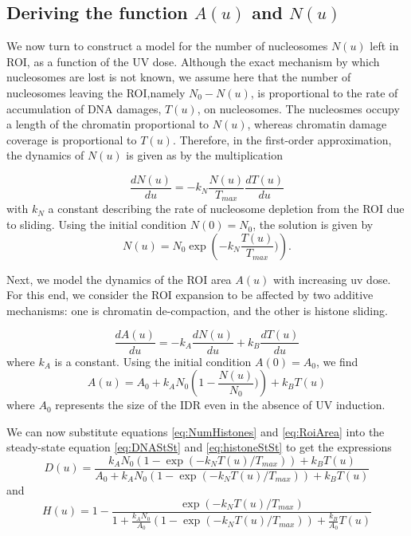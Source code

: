 \documentclass[12pt]{article}
\begin{document}
\subsection{Deriving the function $A(u)$ and $N(u)$}
We now turn to construct a model for the number of nucleosomes $N(u)$ left in ROI, as a function of the UV dose. Although the exact mechanism by which nucleosomes are lost is not known, we assume here that the number of nucleosomes leaving the ROI,namely  $N_0-N(u)$, is proportional to the rate of accumulation of DNA damages, $T(u)$, on nucleosomes. The nucleosmes occupy a length of the chromatin proportional to $N(u)$, whereas chromatin damage coverage is proportional to $T(u)$. Therefore, in the first-order approximation, the dynamics of $N(u)$ is given as by the multiplication 

\begin{equation*}
\frac{dN(u)}{du} = -k_N\frac{N(u)}{T_{max}}\frac{dT(u)}{du}
\end{equation*}
with $k_N$ a constant describing the rate of nucleosome depletion from the ROI due to sliding. Using the initial condition $N(0) = N_0$, the solution is given by
\begin{equation}\label{eq:NumHistones}
N(u) = N_0\exp\left(-k_N\frac{T(u)}{T_{max}})\right).
\end{equation}

Next, we model the dynamics of the ROI area $A(u)$ with increasing uv dose.  For this end, we consider the ROI expansion to be affected by two additive mechanisms: one is chromatin de-compaction, and the other is histone sliding. 

\begin{equation}\label{dralpha}
\frac{dA(u)}{du}=-k_A\frac{dN(u)}{du}+k_B\frac{dT(u)}{du}
\end{equation}
where $k_A$ is a constant. Using the initial condition $A(0)=A_0$, we find 
\begin{equation}\label{eq:RoiArea}
A(u) = A_0 +k_AN_0\left(1-\frac{N(u)}{N_0})\right) +k_BT(u)
\end{equation}
where $A_0$ represents the size of the IDR even in the absence of UV induction.

We can now substitute equations \ref{eq:NumHistones} and \ref{eq:RoiArea} into the steady-state equation \ref{eq:DNAStSt} and \ref{eq:histoneStSt} to get the expressions 
\begin{equation}
\label{eq:DnaLoss}
D(u) = \frac{k_AN_0\left(1-\exp\left(-k_NT(u)/T_{max}\right)\right) +k_BT(u)}{A_0+k_AN_0\left(1-\exp\left(-k_NT(u)/T_{max}\right)\right) +k_BT(u)}
\end{equation}
and 
\begin{equation}\label{eq:histoneLoss}
H(u) = 1- \frac{\exp\left(-k_NT(u)/T_{max}\right)}{1+\frac{k_AN_0}{A_0}\left(1-\exp\left(-k_NT(u)/T_{max}\right)\right) +\frac{k_B}{A_0}T(u)}
\end{equation}
\end{document}
